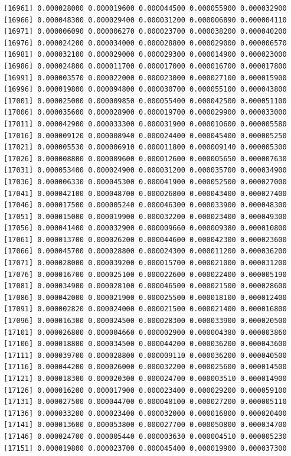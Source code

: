 \documentclass[]{article}
\begin{document}
\begin{verbatim}
[16961] 0.000028000 0.000019600 0.000044500 0.000055900 0.000032900
[16966] 0.000048300 0.000029400 0.000031200 0.000006890 0.000004110
[16971] 0.000006090 0.000006270 0.000023700 0.000038200 0.000040200
[16976] 0.000024200 0.000034000 0.000028800 0.000029000 0.000006570
[16981] 0.000032100 0.000029000 0.000029300 0.000014900 0.000023000
[16986] 0.000024800 0.000011700 0.000017000 0.000016700 0.000017800
[16991] 0.000003570 0.000022000 0.000023000 0.000027100 0.000015900
[16996] 0.000019800 0.000094800 0.000030700 0.000055100 0.000043800
[17001] 0.000025000 0.000009850 0.000055400 0.000042500 0.000051100
[17006] 0.000035600 0.000028900 0.000019700 0.000029900 0.000033000
[17011] 0.000042900 0.000033300 0.000031900 0.000010600 0.000005580
[17016] 0.000009120 0.000008940 0.000024400 0.000045400 0.000005250
[17021] 0.000005530 0.000006910 0.000011800 0.000009140 0.000005300
[17026] 0.000008800 0.000009600 0.000012600 0.000005650 0.000007630
[17031] 0.000053400 0.000024900 0.000031200 0.000035700 0.000034900
[17036] 0.000006330 0.000045300 0.000041900 0.000052500 0.000027000
[17041] 0.000042100 0.000048700 0.000026800 0.000043400 0.000027400
[17046] 0.000017500 0.000005240 0.000046300 0.000033900 0.000048300
[17051] 0.000015000 0.000019900 0.000032200 0.000023400 0.000049300
[17056] 0.000041400 0.000032900 0.000009660 0.000009380 0.000010800
[17061] 0.000013700 0.000026200 0.000044600 0.000042300 0.000023600
[17066] 0.000045700 0.000028800 0.000024300 0.000011200 0.000036200
[17071] 0.000028000 0.000039200 0.000015700 0.000021000 0.000031200
[17076] 0.000016700 0.000025100 0.000022600 0.000022400 0.000005190
[17081] 0.000034900 0.000028100 0.000046500 0.000021500 0.000028600
[17086] 0.000042000 0.000021900 0.000025500 0.000018100 0.000012400
[17091] 0.000002820 0.000024000 0.000021500 0.000021400 0.000016800
[17096] 0.000016300 0.000024500 0.000028300 0.000033900 0.000020500
[17101] 0.000026800 0.000004660 0.000002900 0.000004380 0.000003860
[17106] 0.000018800 0.000034500 0.000044200 0.000036200 0.000043600
[17111] 0.000039700 0.000028800 0.000009110 0.000036200 0.000040500
[17116] 0.000044200 0.000026000 0.000032200 0.000025600 0.000014500
[17121] 0.000018300 0.000020300 0.000024700 0.000003510 0.000014900
[17126] 0.000016200 0.000017900 0.000023400 0.000029200 0.000059100
[17131] 0.000027500 0.000044700 0.000048100 0.000027200 0.000005110
[17136] 0.000033200 0.000023400 0.000032000 0.000016800 0.000020400
[17141] 0.000013600 0.000053800 0.000027700 0.000050800 0.000034700
[17146] 0.000024700 0.000005440 0.000003630 0.000004510 0.000005230
[17151] 0.000019800 0.000023700 0.000045400 0.000019900 0.000037300

\end{verbatim}
\end{document}
